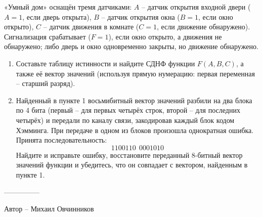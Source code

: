 \question
«Умный дом» оснащён тремя датчиками: $A$ -- датчик открытия входной двери ($A=1$, если дверь открыта), $B$ -- датчик открытия окна ($B=1$, если окно открыто), $C$ -- датчик движения в комнате ($C=1$, если движение обнаружено). Сигнализация срабатывает ($F=1$), если окно открыто, а движения не обнаружено; либо дверь и окно одновременно закрыты, но движение обнаружено.

\begin{enumerate}
\item Составьте таблицу истинности и найдите СДНФ функции $F(A,B,C)$, а также её вектор значений (используя прямую нумерацию: первая переменная -- старший разряд).
\item Найденный в пункте 1 восьмибитный вектор значений разбили на два блока по 4 бита (первый -- для первых четырёх строк, второй -- для последних четырёх) и передали по каналу связи, закодировав каждый блок кодом Хэмминга. При передаче в одном из блоков произошла однократная ошибка. Принята последовательность:
\[
1100110\ \ 0001010
\]
Найдите и исправьте ошибку, восстановите переданный 8-битный вектор значений функции и убедитесь, что он совпадает с вектором, найденным в пункте 1.
\end{enumerate}
---------------

Автор -- Михаил Овчинников